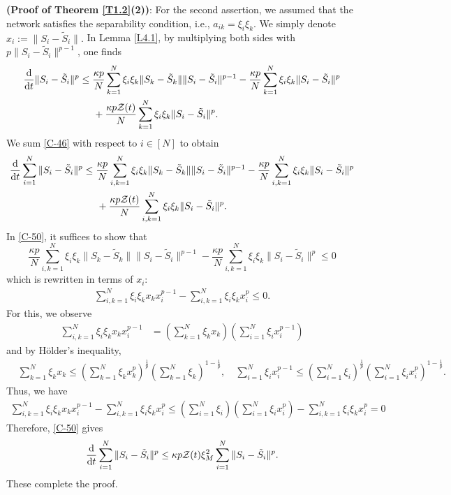 \documentclass[11pt,reqno]{amsart}
\numberwithin{figure}{section}
\newcommand{\kp}{\kappa}
\newcommand{\dd}{  {\textup{d}} }
\newcommand{\dt} {    {  \textup{d}t   }    }
\begin{document}
\noindent \textbf{(Proof of Theorem \ref{T1.2}(2))}: For the second assertion, we assumed that the network satisfies the separability condition, i.e., $a_{ik}  = \xi_i\xi_k$. We simply denote $x_i := \|S_i - \tilde S_i\|.$ In Lemma \ref{L4.1}, by  multiplying both sides with $p\|S_i - \tilde S_i\|^{p-1}$, one finds 
\begin{align} \label{C-46}
\begin{aligned}
\frac\dd\dt \|S_i - \tilde S_i\|^p & \leq \frac{\kp p }{N} \sum_{k=1}^N \xi_i\xi_k \|S_k - \tilde S_k\| \|S_i - \tilde S_i\|^{p-1} - \frac{\kp p}{N} \sum_{k=1}^N \xi_i\xi_k \|S_i- \tilde S_i\|^p \\
&\hspace{0.5cm}+ \frac{\kp p \mathcal Z(t) }{N} \sum_{k=1}^N \xi_i\xi_k \|S_i - \tilde S_i\|^p.
\end{aligned}
\end{align}
We sum \eqref{C-46} with respect to $i\in [N]$ to obtain
\begin{align} \label{C-50}
\begin{aligned}
\frac\dd\dt \sum_{i=1}^N \|S_i - \tilde S_i\|^p & \leq \frac{\kp p}{N} \sum_{i,k=1}^N \xi_i\xi_k \|S_k - \tilde S_k\|\|S_i - \tilde S_i \|^{p-1}  - \frac{\kp p }{N} \sum_{i,k=1}^N\xi_i\xi_k \|S_i - \tilde S_i\|^p \\
&\hspace{0.5cm} + \frac{\kp p \mathcal Z(t) } {N} \sum_{i,k=1}^N \xi_i\xi_k \|S_i - \tilde S_i\|^p.
\end{aligned} 
\end{align}
In \eqref{C-50}, it suffices to show that
\[
\frac{\kp p}{N} \sum_{i,k=1}^N \xi_i\xi_k \|S_k - \tilde S_k\|\|S_i - \tilde S_i \|^{p-1}  - \frac{\kp p }{N} \sum_{i,k=1}^N \xi_i\xi_k \|S_i - \tilde S_i\|^p \leq 0
\]
which is rewritten in terms of $x_i$: 
\begin{align*}
\sum_{i,k=1}^N \xi_i \xi_k x_k x_i^{p-1} - \sum_{i,k=1}^N \xi_i \xi_k x_i^p \leq 0.
\end{align*} 
For this, we observe
\begin{align*}
\sum_{i,k=1}^N \xi_i \xi_k x_k x_i^{p-1} &= \left( \sum_{k=1}^N \xi_k x_k \right)\left( \sum_{i=1}^N \xi_i x_i^{p-1}\right)
\end{align*}
and by H\"older's inequality, 
\begin{align*}
&\sum_{k=1}^N \xi_k x_k \leq \left( \sum_{k=1}^N \xi_k x_k^p \right)^\frac1p \left( \sum_{k=1}^N \xi_k \right)^{1-\frac1p}, \quad \sum_{i=1}^N \xi_i x_i^{p-1} \leq \left( \sum_{i=1}^N \xi_i \right)^\frac1p \left( \sum_{i=1}^N \xi_i x_i^p \right)^{1-\frac1p} .
\end{align*}
Thus, we have
\begin{align*}
\sum_{i,k=1}^N \xi_i \xi_k x_k x_i^{p-1} - \sum_{i,k=1}^N \xi_i \xi_k x_i^p \leq \left(  \sum_{i=1}^N \xi_i \right)  \left( \sum_{i=1}^N\xi_i x_i^p \right) - \sum_{i,k=1}^N \xi_i\xi_k x_i^p =0
\end{align*} 
Therefore, \eqref{C-50} gives 
\begin{align*}
\frac\dd\dt \sum_{i=1}^N \|S_i - \tilde S_i\|^p \leq \kp p \mathcal Z(t) \xi_M^2 \sum_{i=1}^N \|S_i - \tilde S_i\|^p . 
\end{align*}
These complete the proof. 
\end{document}

